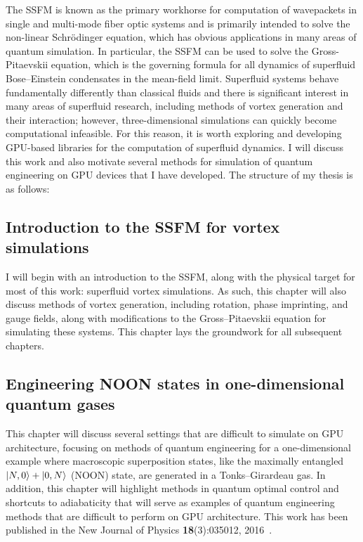 The SSFM is known as the primary workhorse for computation of wavepackets in single and multi-mode fiber optic systems and is primarily intended to solve the non-linear Schr\"odinger equation, which has obvious applications in many areas of quantum simulation.
In particular, the SSFM can be used to solve the Gross-Pitaevskii equation, which is the governing formula for all dynamics of superfluid Bose--Einstein condensates in the mean-field limit.
Superfluid systems behave fundamentally differently than classical fluids and there is significant interest in many areas of superfluid research, including methods of vortex generation and their interaction; however, three-dimensional simulations can quickly become computational infeasible.
For this reason, it is worth exploring and developing GPU-based libraries for the computation of superfluid dynamics.
I will discuss this work and also motivate several methods for simulation of quantum engineering on GPU devices that I have developed.
The structure of my thesis is as follows:

\subsection*{Introduction to the SSFM for vortex simulations}

I will begin with an introduction to the SSFM, along with the physical target for most of this work: superfluid vortex simulations.
As such, this chapter will also discuss methods of vortex generation, including rotation, phase imprinting, and gauge fields, along with modifications to the Gross--Pitaevskii equation for simulating these systems.
This chapter lays the groundwork for all subsequent chapters.

\subsection*{Engineering NOON states in one-dimensional quantum gases}

This chapter will discuss several settings that are difficult to simulate on GPU architecture, focusing on methods of quantum engineering for a one-dimensional example where macroscopic superposition states, like the maximally entangled $\ket{N,0} + \ket{0,N}$ (NOON) state, are generated in a Tonks--Girardeau gas.
In addition, this chapter will highlight methods in quantum optimal control and shortcuts to adiabaticity that will serve as examples of quantum engineering methods that are difficult to perform on GPU architecture.
This work has been published in the New Journal of Physics \textbf{18}(3):035012, 2016~\cite{schloss2016}.


